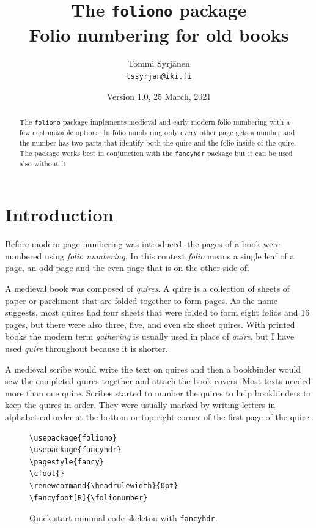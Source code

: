 \documentclass[a4paper, 12pt]{article}
\title{The \texttt{foliono} package \\
  Folio numbering for old books}
\author{Tommi Syrjänen\\ \texttt{tssyrjan@iki.fi}}
\date{Version 1.0, 25 March, 2021}
\newcommand{\feature}[1]{\texttt{#1}}
\begin{document}
\maketitle

\begin{abstract}
  The \texttt{foliono} package implements medieval and early modern
  folio numbering with a few customizable options. In folio numbering
  only every other page gets a number and the number has two parts
  that identify both the quire and the folio inside of the quire. The
  package works best in conjunction with the \texttt{fancyhdr} package
  but it can be used also without it. 
\end{abstract}

\section{Introduction}

Before modern page numbering was introduced, the pages of a book were
numbered using \emph{folio numbering}. In this context \emph{folio}
means a single leaf of a page, an odd page and the even page that is
on the other side of. 

A medieval book was composed of \emph{quires}. A quire is a collection
of sheets of paper or parchment that are folded together to form
pages. As the name suggests, most quires had four sheets that were
folded to form eight folios and 16 pages, but there were also three,
five, and even six sheet quires. With printed books the modern term
\emph{gathering} is usually used in place of \emph{quire}, but I have
used \emph{quire} throughout because it is shorter.

A medieval scribe would write the text on quires and then a bookbinder
would sew the completed quires together and attach the book covers.
Most texts needed more than one quire. Scribes started to number the
quires to help bookbinders to keep the quires in order. They were
usually marked by writing letters in alphabetical order at the bottom
or top right corner of the first page of the quire.

\begin{figure}
  \centering
\begin{verbatim}
\usepackage{foliono}
\usepackage{fancyhdr}
\pagestyle{fancy}
\cfoot{}
\renewcommand{\headrulewidth}{0pt} 
\fancyfoot[R]{\folionumber}
\end{verbatim}
  \caption{Quick-start minimal code skeleton with \feature{fancyhdr}.}
  \label{fig:quick_start}
\end{figure}
\end{document}
